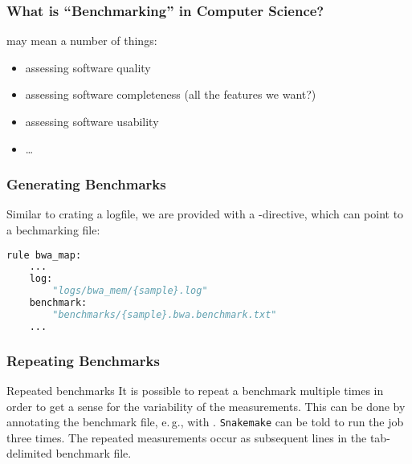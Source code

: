 \begin{frame}
  \frametitle{What is ``Benchmarking'' in Computer Science?}
   may mean a number of things:
  \begin{itemize}[<+->]
   \item assessing software quality
   \item assessing software completeness (all the features we want?)
   \item assessing software usability
   \item \ldots
  \end{itemize}
  \pause
\end{frame}

\begin{frame}[fragile]
  \frametitle{Generating Benchmarks}
  Similar to crating a logfile, we are provided with a -directive, which can point to a bechmarking file:
  \begin{lstlisting}[language=Python,style=Python]
rule bwa_map:
    ...
    log:
        "logs/bwa_mem/{sample}.log"
    benchmark:
        "benchmarks/{sample}.bwa.benchmark.txt"
    ...
  \end{lstlisting} 
\end{frame}

\begin{frame}[fragile]
  \frametitle{Repeating Benchmarks}
  \vfill
  \begin{exampleblock}{Repeated benchmarks}
   It is possible to repeat a benchmark multiple times in order to get a sense for the variability of the measurements. This can be done by annotating the benchmark file, e.\,g., with . \texttt{Snakemake} can be told to run the job three times. The repeated measurements occur as subsequent lines in the tab-delimited benchmark file.
  \end{exampleblock}
  \vfill
\end{frame} 

